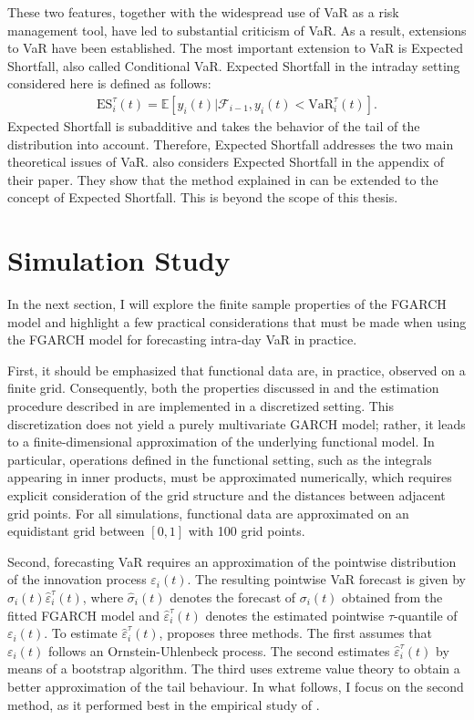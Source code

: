 \documentclass[12pt,a4paper]{article}
\theoremstyle{definition}
\begin{document}
These two features, together with the widespread use of VaR as a risk management tool, have led to substantial criticism of VaR. As a result, extensions to VaR have been established. The most important extension to VaR is Expected Shortfall, also called Conditional VaR. Expected Shortfall in the intraday setting considered here is defined as follows:
\begin{gather}
    \mathrm{ES}_i^\tau(t)= \mathbb{E}[y_i(t)|\mathcal{F}_{i-1},y_i(t)<\mathrm{VaR}_i^\tau(t)].
\end{gather}
Expected Shortfall is subadditive and takes the behavior of the tail of the distribution into account. Therefore, Expected Shortfall addresses the two main theoretical issues of VaR. \citet{RICE20201023} also considers Expected Shortfall in the appendix of their paper. They show that the method explained in  can be extended to the concept of Expected Shortfall. This is beyond the scope of this thesis.
\section{Simulation Study}
\label{sec:Simulation}
In the next section, I will explore the finite sample properties of the FGARCH model and highlight a few practical considerations that must be made when using the FGARCH model for forecasting intra-day VaR in practice.

First, it should be emphasized that functional data are, in practice, observed on a finite grid. Consequently, both the properties discussed in  and the estimation procedure described in  are implemented in a discretized setting. This discretization does not yield a purely multivariate GARCH model; rather, it leads to a finite-dimensional approximation of the underlying functional model. In particular, operations defined in the functional setting, such as the integrals appearing in inner products, must be approximated numerically, which requires explicit consideration of the grid structure and the distances between adjacent grid points. For all simulations, functional data are approximated on an equidistant grid between $[0,1]$ with 100 grid points.

Second, forecasting VaR requires an approximation of the pointwise distribution of the innovation process $\varepsilon_i(t)$. The resulting pointwise VaR forecast is given by $\hat{\sigma}_i(t)\hat{\varepsilon}_i^\tau(t)$, where $\hat{\sigma}_i(t)$ denotes the forecast of $\sigma_i(t)$ obtained from the fitted FGARCH model and $\hat{\varepsilon}_i^\tau(t)$ denotes the estimated pointwise $\tau$-quantile of $\varepsilon_i(t)$. To estimate $\hat{\varepsilon}_i^\tau(t)$, \citet{RICE20201023} proposes three methods. The first assumes that $\varepsilon_i(t)$ follows an Ornstein-Uhlenbeck process. The second estimates $\hat{\varepsilon}_i^\tau(t)$ by means of a bootstrap algorithm. The third uses extreme value theory to obtain a better approximation of the tail behaviour. In what follows, I focus on the second method, as it performed best in the empirical study of \citeauthor{RICE20201023}.
\end{document}
